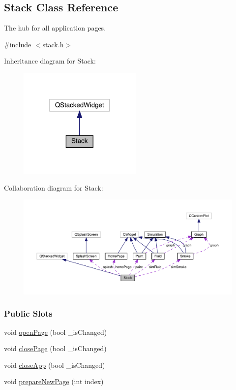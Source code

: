 \hypertarget{classStack}{}\subsection{Stack Class Reference}
\label{classStack}


The hub for all application pages.  




{\ttfamily \#include $<$stack.\+h$>$}



Inheritance diagram for Stack\+:\nopagebreak
\begin{figure}[H]
\begin{center}
\leavevmode
\includegraphics[width=171pt]{classStack__inherit__graph}
\end{center}
\end{figure}


Collaboration diagram for Stack\+:\nopagebreak
\begin{figure}[H]
\begin{center}
\leavevmode
\includegraphics[width=350pt]{classStack__coll__graph}
\end{center}
\end{figure}
\subsubsection*{Public Slots}
\begin{DoxyCompactItemize}
\item 
void \mbox{\hyperlink{classStack_a3663db1c1578aabe63286d4f2bb6fc6f}{open\+Page}} (bool \+\_\+is\+Changed)
\item 
void \mbox{\hyperlink{classStack_a69cd464c336cb480ad54ac2c83c309e1}{close\+Page}} (bool \+\_\+is\+Changed)
\item 
void \mbox{\hyperlink{classStack_a2f8a3dee32407abe994b7332282d03de}{close\+App}} (bool \+\_\+is\+Changed)
\item 
void \mbox{\hyperlink{classStack_a836814b5492af3a0a4cc613d11b56397}{prepare\+New\+Page}} (int index)
\end{DoxyCompactItemize}
